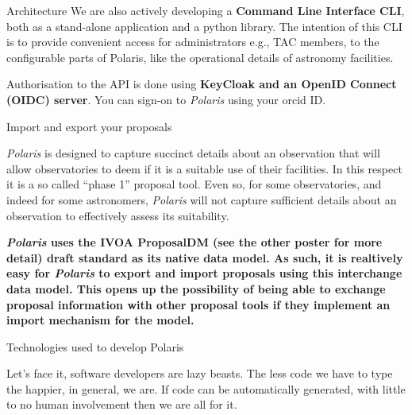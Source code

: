 \documentclass[final]{beamer}
\newlength{\colwidth}
\begin{document}
\begin{frame}[t]
\begin{columns}[t]
\begin{column}{\colwidth}
\begin{block}{Architecture}
                    We are also actively developing a \textbf{Command Line Interface CLI}, both as a stand-alone application and
                    a python library.
                    The intention of this CLI is to provide convenient access for administrators e.g., TAC members, to
                    the configurable parts of Polaris, like the operational details of astronomy facilities.

                    Authorisation to the API is done using \textbf{KeyCloak and an OpenID Connect (OIDC) server}.
                    You can sign-on to \emph{Polaris} using your orcid ID\@.

                \end{block}

                \begin{alertblock}{Import and export your proposals}

                    \emph{Polaris} is designed to capture succinct details about an observation
                    that will allow observatories to deem if it is a suitable use of their facilities.
                    In this respect it is a so called ``phase 1'' proposal tool.
                    Even so, for some observatories, and indeed for some astronomers, \emph{Polaris} will not
                    capture sufficient details about an observation to effectively assess its suitability.

                    \textbf{\emph{Polaris} uses the IVOA ProposalDM (see the other poster for more detail) draft
                    standard as its native data model.
                    As such, it is realtively easy for \emph{Polaris} to export and import proposals using this
                    interchange data model.
                    This opens up the possibility of being able to exchange proposal information with other proposal
                    tools if they implement an import mechanism for the model.
                    }

                \end{alertblock}

                \begin{block}{Technologies used to develop Polaris}

                    Let's face it, software developers are lazy beasts.
                    The less code we have to type the happier, in general, we are.
                    If code can be automatically generated, with little to no human involvement then we are
                    all for it.


\end{block}
\end{column}
\end{columns}
\end{frame}
\end{document}

